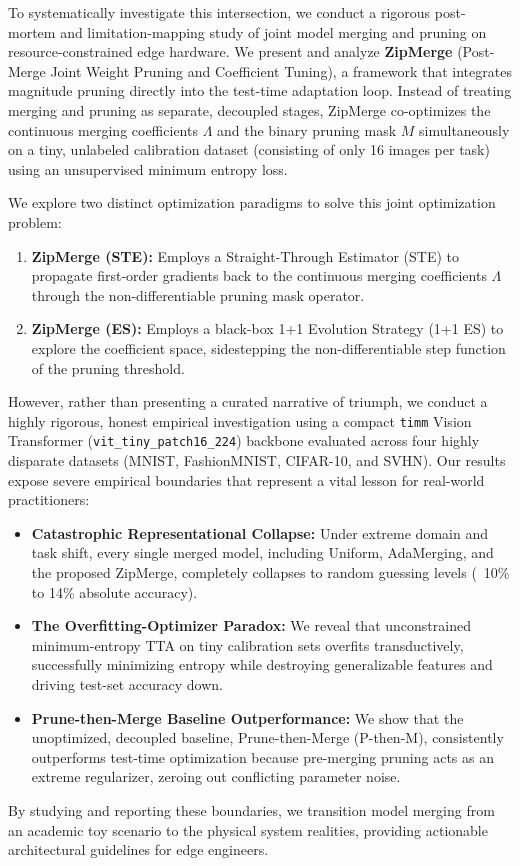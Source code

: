 To systematically investigate this intersection, we conduct a rigorous post-mortem and limitation-mapping study of joint model merging and pruning on resource-constrained edge hardware. We present and analyze \textbf{ZipMerge} (Post-Merge Joint Weight Pruning and Coefficient Tuning), a framework that integrates magnitude pruning directly into the test-time adaptation loop. Instead of treating merging and pruning as separate, decoupled stages, ZipMerge co-optimizes the continuous merging coefficients $\Lambda$ and the binary pruning mask $M$ simultaneously on a tiny, unlabeled calibration dataset (consisting of only 16 images per task) using an unsupervised minimum entropy loss. 

We explore two distinct optimization paradigms to solve this joint optimization problem:
\begin{enumerate}[leftmargin=*]
    \item \textbf{ZipMerge (STE):} Employs a Straight-Through Estimator (STE) \cite{bengio2013estimating} to propagate first-order gradients back to the continuous merging coefficients $\Lambda$ through the non-differentiable pruning mask operator.
    \item \textbf{ZipMerge (ES):} Employs a black-box 1+1 Evolution Strategy (1+1 ES) \cite{salimans2017evolution} to explore the coefficient space, sidestepping the non-differentiable step function of the pruning threshold.
\end{enumerate}

However, rather than presenting a curated narrative of triumph, we conduct a highly rigorous, honest empirical investigation using a compact \texttt{timm} Vision Transformer (\texttt{vit\_tiny\_patch16\_224}) backbone evaluated across four highly disparate datasets (MNIST, FashionMNIST, CIFAR-10, and SVHN). Our results expose severe empirical boundaries that represent a vital lesson for real-world practitioners:
\begin{itemize}[leftmargin=*]
    \item \textbf{Catastrophic Representational Collapse:} Under extreme domain and task shift, every single merged model, including Uniform, AdaMerging, and the proposed ZipMerge, completely collapses to random guessing levels (~10\% to 14\% absolute accuracy).
    \item \textbf{The Overfitting-Optimizer Paradox:} We reveal that unconstrained minimum-entropy TTA on tiny calibration sets overfits transductively, successfully minimizing entropy while destroying generalizable features and driving test-set accuracy down.
    \item \textbf{Prune-then-Merge Baseline Outperformance:} We show that the unoptimized, decoupled baseline, Prune-then-Merge (P-then-M), consistently outperforms test-time optimization because pre-merging pruning acts as an extreme regularizer, zeroing out conflicting parameter noise.
\end{itemize}

By studying and reporting these boundaries, we transition model merging from an academic toy scenario to the physical system realities, providing actionable architectural guidelines for edge engineers.
